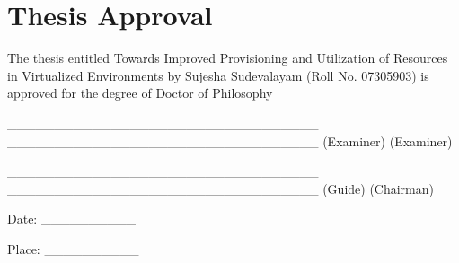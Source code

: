 \section*{Thesis Approval}

\begin{center}

The thesis entitled
Towards Improved Provisioning and Utilization of Resources in Virtualized Environments
by
Sujesha Sudevalayam
(Roll No. 07305903)
is approved for the degree of 
Doctor of Philosophy

\end{center}

\_\_\_\_\_\_\_\_\_\_\_\_\_\_\_\_\_\_\_\_\_\_\_\_\_\_\_\_\_\_\_\_\_	\_\_\_\_\_\_\_\_\_\_\_\_\_\_\_\_\_\_\_\_\_\_\_\_\_\_\_\_\_\_\_\_\_
(Examiner)							(Examiner)



\_\_\_\_\_\_\_\_\_\_\_\_\_\_\_\_\_\_\_\_\_\_\_\_\_\_\_\_\_\_\_\_\_	\_\_\_\_\_\_\_\_\_\_\_\_\_\_\_\_\_\_\_\_\_\_\_\_\_\_\_\_\_\_\_\_\_
(Guide)								(Chairman)



Date: \_\_\_\_\_\_\_\_\_\_


Place: \_\_\_\_\_\_\_\_\_\_


